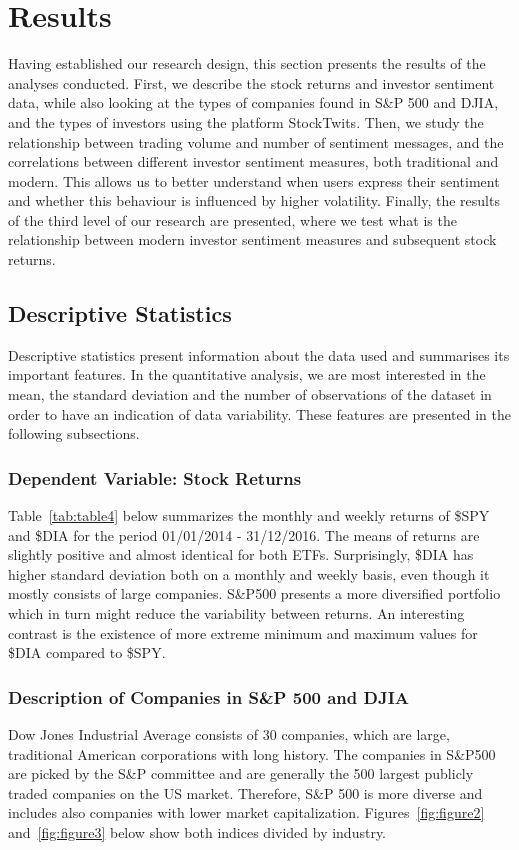 \section{Results} \label{results-section}
Having established our research design, this section presents the results of the analyses conducted. First, we describe the stock returns and investor sentiment data, while also looking at the types of companies found in S\&P 500 and DJIA, and the types of investors using the platform StockTwits. Then, we study the relationship between trading volume and number of sentiment messages, and the correlations between different investor sentiment measures, both traditional and modern. This allows us to better understand when users express their sentiment and whether this behaviour is influenced by higher volatility. Finally, the results of the third level of our research are presented, where we test what is the relationship between modern investor sentiment measures and subsequent stock returns.

\subsection{Descriptive Statistics}
Descriptive statistics present information about the data used and summarises its important features. In the quantitative analysis, we are most interested in the mean, the standard deviation and the number of observations of the dataset in order to have an indication of data variability. These features are presented in the following subsections.

\subsubsection{Dependent Variable: Stock Returns}
Table~\ref{tab:table4} below summarizes the monthly and weekly returns of \$SPY and \$DIA for the period 01/01/2014 - 31/12/2016. The means of returns are slightly positive and almost identical for both ETFs. Surprisingly, \$DIA has higher standard deviation both on a monthly and weekly basis, even though it mostly consists of large companies. S\&P500 presents a more diversified portfolio which in turn might reduce the variability between returns. An interesting contrast is the existence of more extreme minimum and maximum values for \$DIA compared to \$SPY.



\subsubsection{Description of Companies in S\&P 500 and DJIA}
Dow Jones Industrial Average consists of 30 companies, which are large, traditional American corporations with long history. The companies in S\&P500 are picked by the S\&P committee and are generally the 500 largest publicly traded companies on the US market. Therefore, S\&P 500 is more diverse and includes also companies with lower market capitalization. Figures~\ref{fig:figure2} and~\ref{fig:figure3} below show both indices divided by industry.


